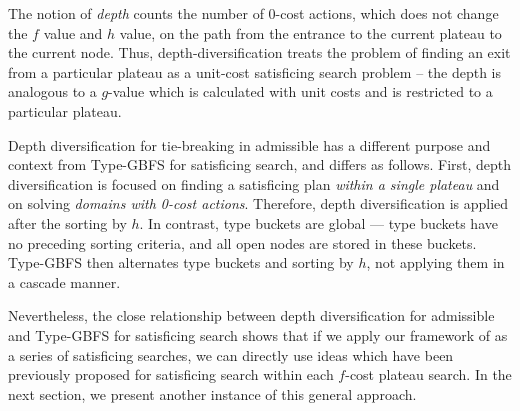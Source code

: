 The notion of \emph{depth} counts the number of 0-cost actions, which does not change the $f$ value and $h$
value, on the path from the entrance to the current plateau to the current node.  Thus, 
depth-diversification treats  the problem of finding an exit from a particular plateau as a unit-cost satisficing search problem
-- the depth is analogous to a $g$-value which is calculated with unit costs and is restricted to a particular plateau.

Depth diversification for tie-breaking in admissible \astar has a different purpose and context from Type-GBFS for satisficing search,
and differs as follows.
First, depth diversification  is focused on finding a satisficing plan \emph{within a single plateau} and on solving \emph{domains with 0-cost actions}.
Therefore, depth diversification is applied after the sorting by $h$.
In contrast, type buckets are global --- type buckets have no preceding sorting criteria, and all open nodes are stored in these buckets. Type-GBFS then alternates type buckets and sorting by $h$, not applying them in a cascade manner.

Nevertheless, the close relationship between depth diversification for admissible \astar and Type-GBFS for satisficing search shows that if we apply our framework of \astar as a series of satisficing searches, we can directly use ideas which have been previously proposed for satisficing search within each $f$-cost plateau search.
In the next section, we present another instance of this general approach.

